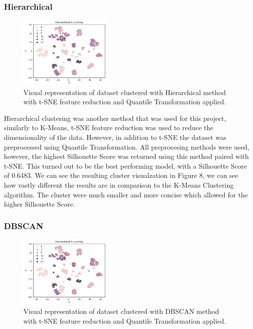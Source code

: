\documentclass[twocolumn]{article}
\begin{document}
\subsubsection{Hierarchical}

\begin{figure}
    \centering
    \includegraphics[width=0.4\textwidth]{images/hierarchical.png}
    \caption{Visual representation of dataset clustered with Hierarchical method with t-SNE feature reduction and Quantile Transformation applied.}
\end{figure}

Hierarchical clustering was another method that was used for this project, similarly to K-Means, t-SNE feature reduction was used to reduce the dimensionality of the data. However, in addition to t-SNE the dataset was preprocessed using Quantile Transformation. All preprocesing methods were used, however, the highest Silhouette Score was returned using this method paired with t-SNE. This turned out to be the best performing model, with a Silhouette Score of 0.6483. We can see the resulting cluster visualzation in Figure 8, we can see how vastly different the results are in comparison to the K-Means Clustering algorithm. The cluster were much smaller and more concise which allowed for the higher Silhouette Score.


\subsubsection{DBSCAN}

\begin{figure}
    \centering
    \includegraphics[width=0.4\textwidth]{images/hierarchical.png}
    \caption{Visual representation of dataset clustered with DBSCAN method with t-SNE feature reduction and Quantile Transformation applied.}
\end{figure}
\end{document}
